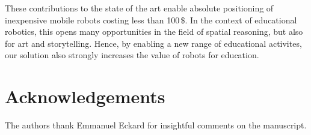 \documentclass[letterpaper, 10pt, conference]{ieeeconf}
\begin{document}
These contributions to the state of the art enable absolute positioning of inexpensive mobile robots costing less than 100\,\$.
In the context of educational robotics, this opens many opportunities in the field of spatial reasoning, but also for art and storytelling.
Hence, by enabling a new range of educational activites, our solution also strongly increases the value of robots for education.

\section{Acknowledgements}

The authors thank Emmanuel Eckard for insightful comments on the manuscript.



\end{document}

